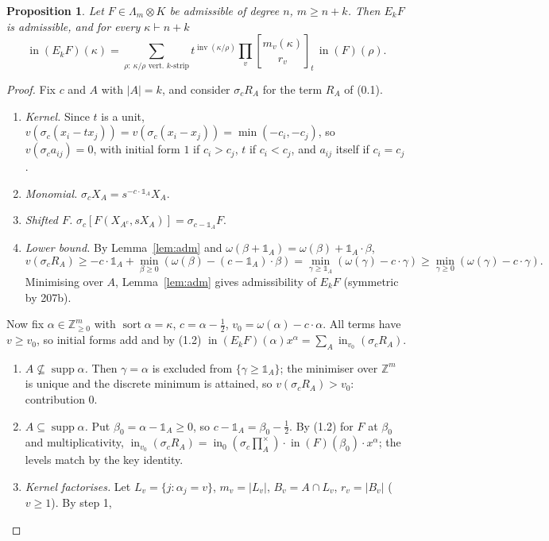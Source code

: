 \documentclass[11pt]{article}
\newtheorem{proposition}[lemma]{Proposition}
\theoremstyle{definition}
\newcommand{\Z}{\mathbb{Z}}
\newcommand{\prodx}{\textstyle\prod^{\times}}
\newcommand{\sort}{\operatorname{sort}}
\newcommand{\supp}{\operatorname{supp}}
\newcommand{\inn}{\operatorname{in}}
\newcommand{\inv}{\operatorname{inv}}
\newcommand{\one}{\mathbb{1}}
\newcommand{\gbin}[3]{\genfrac{[}{]}{0pt}{}{#1}{#2}_{#3}}
\begin{document}
\begin{proposition}\label{prop:rec}
Let $F\in\Lambda_m\otimes K$ be admissible of degree $n$, $m\ge n+k$. Then $E_kF$ is admissible, and for every $\kappa\vdash n+k$
\begin{equation}\tag{2.3}
\inn(E_kF)(\kappa)=\sum_{\rho:\ \kappa/\rho\text{ vert.\ }k\text{-strip}}t^{\inv(\kappa/\rho)}\prod_v\gbin{m_v(\kappa)}{r_v}{t}\,\inn(F)(\rho).
\end{equation}
\end{proposition}
\begin{proof}
Fix $c$ and $A$ with $|A|=k$, and consider $\sigma_cR_A$ for the term $R_A$ of (0.1).
\begin{enumerate}[label=\arabic*.]
\item \emph{Kernel.} Since $t$ is a unit, $v(\sigma_c(x_i-tx_j))=v(\sigma_c(x_i-x_j))=\min(-c_i,-c_j)$, so $v(\sigma_ca_{ij})=0$, with initial form $1$ if $c_i>c_j$, $t$ if $c_i<c_j$, and $a_{ij}$ itself if $c_i=c_j$.
\item \emph{Monomial.} $\sigma_cX_A=s^{-c\cdot\one_A}X_A$.
\item \emph{Shifted $F$.} $\sigma_c[F(X_{A^c},sX_A)]=\sigma_{c-\one_A}F$.
\item \emph{Lower bound.} By Lemma~\ref{lem:adm} and $\omega(\beta+\one_A)=\omega(\beta)+\one_A\cdot\beta$,
\[v(\sigma_cR_A)\ge-c\cdot\one_A+\min_{\beta\ge0}(\omega(\beta)-(c-\one_A)\cdot\beta)=\min_{\gamma\ge\one_A}(\omega(\gamma)-c\cdot\gamma)\ge\min_{\gamma\ge0}(\omega(\gamma)-c\cdot\gamma).\]
Minimising over $A$, Lemma~\ref{lem:adm} gives admissibility of $E_kF$ (symmetric by 207b).
\end{enumerate}
Now fix $\alpha\in\Z^m_{\ge0}$ with $\sort\alpha=\kappa$, $c=\alpha-\frac12$, $v_0=\omega(\alpha)-c\cdot\alpha$. All terms have $v\ge v_0$, so initial forms add and by (1.2) $\inn(E_kF)(\alpha)x^\alpha=\sum_A\inn_{v_0}(\sigma_cR_A)$.
\begin{enumerate}[label=\arabic*.,resume]
\item \emph{$A\not\subseteq\supp\alpha$.} Then $\gamma=\alpha$ is excluded from $\{\gamma\ge\one_A\}$; the minimiser over $\Z^m$ is unique and the discrete minimum is attained, so $v(\sigma_cR_A)>v_0$: contribution $0$.
\item \emph{$A\subseteq\supp\alpha$.} Put $\beta_0=\alpha-\one_A\ge0$, so $c-\one_A=\beta_0-\frac12$. By (1.2) for $F$ at $\beta_0$ and multiplicativity, $\inn_{v_0}(\sigma_cR_A)=\inn_0(\sigma_c\prodx_A)\cdot\inn(F)(\beta_0)\cdot x^\alpha$; the levels match by the key identity.
\item \emph{Kernel factorises.} Let $L_v=\{j:\alpha_j=v\}$, $m_v=|L_v|$, $B_v=A\cap L_v$, $r_v=|B_v|$ ($v\ge1$). By step 1,

\end{enumerate}
\end{proof}
\end{document}
